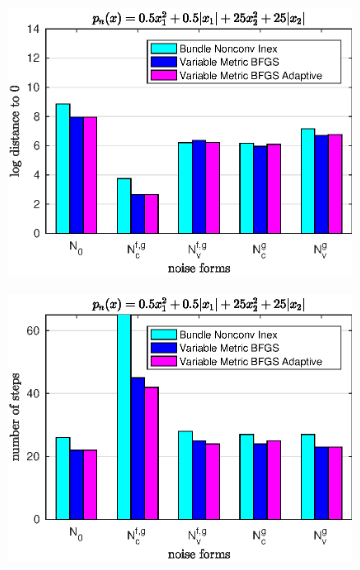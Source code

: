 \begin{figure}[H]
	\begin{subfigure}[t]{0.49\textwidth}
		\includegraphics[width=\textwidth]{Pictures/Plots/accuracy_bar_nonsm_parab.eps}
	\end{subfigure}
	\begin{subfigure}[t]{0.49\textwidth}
		\begin{center}
			\includegraphics[width=\textwidth]{Pictures/Plots/steps_bar_nonsm_parab.eps}
			\subcaption{}
		\end{center}
	\end{subfigure}
	\caption{}
	\label{fig_bar_nonsm_parab}
\end{figure}

